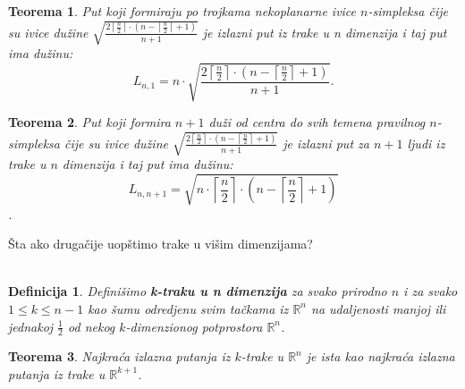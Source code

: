 \documentclass[b1paper,portrait]{template/baposter}
\newtheorem{theorem}{Teorema}
\newtheorem*{definition}{Definicija}
\begin{document}
\begin{poster}
{ 	\begin{theorem} Put koji formiraju po trojkama nekoplanarne ivice $n$-simpleksa \v cije su ivice du\v zine 
 		$\sqrt{\frac{2\left\lceil \frac{n}{2}\right\rceil\cdot \left( n-\left\lceil\frac{n}{2}\right\rceil+1\right)}{n+1}}$
 		je izlazni put iz trake u n dimenzija i taj put ima du\v zinu:
		$$L_{n,1}=n\cdot \sqrt{\frac{2\left\lceil \frac{n}{2}\right\rceil\cdot \left( n-\left\lceil\frac{n}{2}\right\rceil+1\right)}{n+1}}.$$
	\end{theorem}
	\begin{theorem}
 		Put koji formira $n+1$ du\v zi od centra do svih temena pravilnog $n$-simpleksa  \v cije su ivice du\v zine
 		$\sqrt{\frac{2\left\lceil \frac{n}{2}\right\rceil\cdot \left( n-\left\lceil\frac{n}{2}\right\rceil+1\right)}{n+1}}$
 		je izlazni put za $n+1$ ljudi iz trake u $n$ dimenzija i taj put ima du\v zinu:
		$$L_{n,n+1}=\sqrt{n\cdot\left\lceil\frac{n}{2}\right\rceil\cdot\left( n-\left\lceil\frac{n}{2}\right\rceil+1\right)}$$.
 	\end{theorem}
	 \vspace{0.15cm}
}



{
	\v Sta ako druga\v cije uop\v stimo trake u vi\v sim dimenzijama? \\ \\
	\begin{definition}
		Defini\v simo \textbf{k-traku u n dimenzija} za svako prirodno $n$ i za svako $1\leqslant k\leqslant n-1$  kao \v sumu odredjenu
		svim ta\v ckama iz $\mathbb{R}^n$ na udaljenosti manjoj ili jednakoj $\frac{1}{2}$ od nekog $k$-dimenzionog potprostora $\mathbb{R}^n$. 
	\end{definition}
	\begin{theorem}
		Najkra\' ca izlazna putanja iz $k$-trake u $\mathbb{R}^n$ je ista kao najkra\' ca izlazna putanja iz trake u $\mathbb{R}^{k+1}$.
	\end{theorem}
	\vspace{0.15cm}
}





\end{poster}
\end{document}
